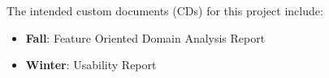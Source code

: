 The intended custom documents (CDs) for this project include:

\begin{itemize}

    \item \textbf{Fall}: Feature Oriented Domain Analysis Report 
    \item \textbf{Winter}: Usability Report

\end{itemize}